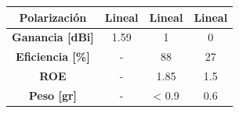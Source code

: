 \begin{table}[H]
\begin{tabular}{|c|c|c|c}
\textbf{Polarización}                                                       & Lineal                                                                                                                                     & Lineal                                                                                                                                         		& \multicolumn{1}{c|}{Lineal}                                                                                                   \\ \hline
\textbf{Ganancia [dBi]}                                                     & 1.59                                                                                                                                       & 1                                                                                                                                              		& \multicolumn{1}{c|}{0}                                                                                                        \\ \hline
\textbf{Eficiencia [\%]}                                                    & -                                                                                                                                          & 88                                                                                                                                             		& \multicolumn{1}{c|}{27}                                                                                                       \\ \hline
\textbf{ROE}                                                                & -                                                                                                                                          & 1.85                                                                                                                                           		& \multicolumn{1}{c|}{1.5}                                                                                                      \\ \hline
\textbf{Peso [gr]}                                                          & -                                                                                                                                          & < 0.9                                                                                                                                          		& \multicolumn{1}{c|}{0.6}                                                                                                      \\ \hline

\end{tabular}
\end{table}
